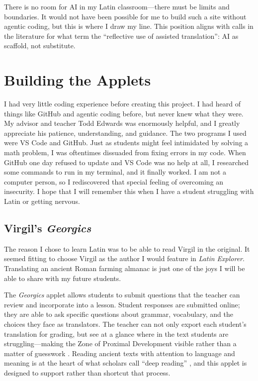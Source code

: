 \documentclass[11pt, a4paper]{article}
\begin{document}
There is no room for AI in my Latin classroom---there must be limits and
boundaries. It would not have been possible for me to build such a site
without agentic coding, but this is where I draw my line. This position
aligns with calls in the literature for what \textcite{Colace2025} term the
``reflective use of assisted translation'': AI as scaffold, not substitute.

\section{Building the Applets}

I had very little coding experience before creating this project. I had
heard of things like GitHub and agentic coding before, but never knew what
they were. My advisor and teacher Todd Edwards was enormously helpful, and I
greatly appreciate his patience, understanding, and guidance. The two
programs I used were VS Code and GitHub. Just as students might feel
intimidated by solving a math problem, I was oftentimes dissuaded from
fixing errors in my code. When GitHub one day refused to update and VS Code
was no help at all, I researched some commands to run in my terminal, and it
finally worked. I am not a computer person, so I rediscovered that special
feeling of overcoming an insecurity. I hope that I will remember this when I
have a student struggling with Latin or getting nervous.

\subsection{Virgil's \textit{Georgics}}

The reason I chose to learn Latin was to be able to read Virgil in the
original. It seemed fitting to choose Virgil as the author I would feature
in \textit{Latin Explorer}. Translating an ancient Roman farming almanac is
just one of the joys I will be able to share with my future students.

The \textit{Georgics} applet allows students to submit questions that the
teacher can review and incorporate into a lesson. Student responses are
submitted online; they are able to ask specific questions about grammar,
vocabulary, and the choices they face as translators. The teacher can not
only export each student's translation for grading, but see at a glance
where in the text students are struggling---making the Zone of Proximal
Development visible rather than a matter of guesswork \autocite{Vygotsky1978}.
Reading ancient texts with attention to language and meaning is at the heart
of what scholars call ``deep reading'' \autocite{Wolf2018}, and this applet
is designed to support rather than shortcut that process.
\end{document}
